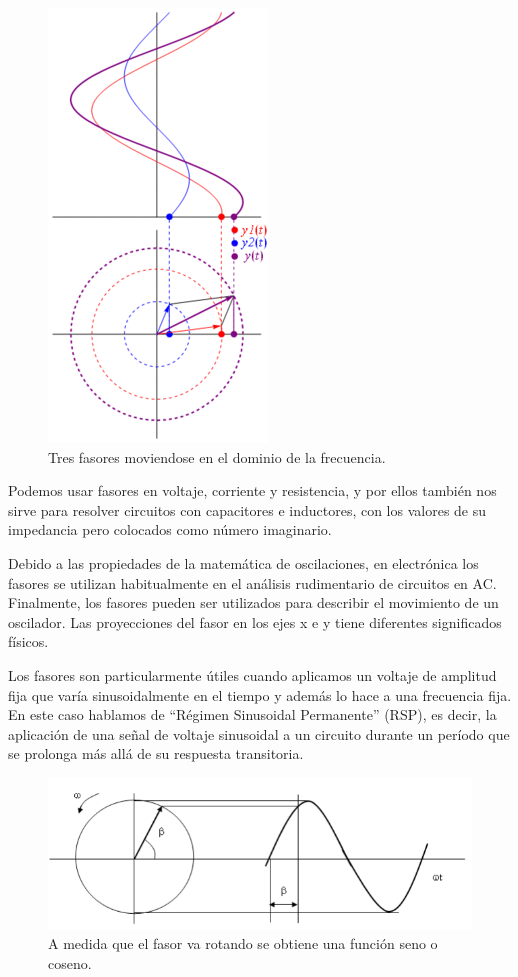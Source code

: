 \documentclass{mylib/reporte}
\begin{document}
\begin{figure}[H]
	\centering
	\includegraphics[scale=0.5]{img/circ_expo/image7}
	\caption{Tres fasores moviendose en el dominio de la frecuencia.}
\end{figure}

Podemos usar fasores en voltaje, corriente y resistencia, y por ellos también nos sirve para resolver circuitos con capacitores e inductores, con los valores de su impedancia pero colocados como número imaginario.

Debido a las propiedades de la matemática de oscilaciones, en electrónica los fasores se utilizan habitualmente en el análisis rudimentario de circuitos en AC. Finalmente, los fasores pueden ser utilizados para describir el movimiento de un oscilador. Las proyecciones del fasor en los ejes x e y tiene diferentes significados físicos.

Los fasores son particularmente útiles cuando aplicamos un voltaje de amplitud fija que varía sinusoidalmente en el tiempo y además lo hace a una frecuencia fija. En este caso hablamos de “Régimen Sinusoidal Permanente” (RSP), es decir, la aplicación de una señal de voltaje sinusoidal a un circuito durante un período que se prolonga más allá de su respuesta transitoria. 

\begin{figure}[H]
	\centering
	\includegraphics[scale=0.5]{img/circ_expo/image4}
	\caption{A medida que el fasor va rotando se obtiene una función seno o coseno.}
\end{figure}
\end{document}
